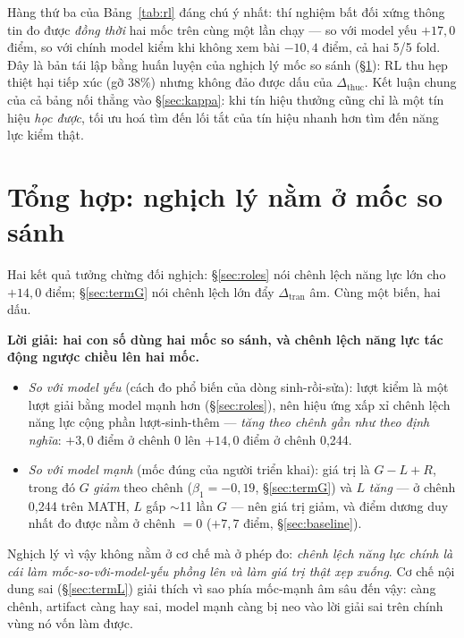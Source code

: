 \documentclass[11pt,a4paper]{article}
\newcommand{\dceil}{\Delta_{\mathrm{tran}}}
\newcommand{\dhonest}{\Delta_{\mathrm{thuc}}}
\begin{document}
Hàng thứ ba của Bảng~\ref{tab:rl} đáng chú ý nhất: thí nghiệm bất đối xứng thông tin đo được
\emph{đồng thời} hai mốc trên cùng một lần chạy --- so với model yếu $+17{,}0$ điểm, so với
chính model kiểm khi không xem bài $-10{,}4$ điểm, cả hai 5/5 fold. Đây là bản tái lập bằng
huấn luyện của nghịch lý mốc so sánh (\S\ref{sec:synthesis}): RL thu hẹp thiệt hại tiếp xúc
(gỡ 38\%) nhưng không đảo được dấu của $\dhonest$. Kết luận chung của cả bảng nối thẳng vào
\S\ref{sec:kappa}: khi tín hiệu thưởng cũng chỉ là một tín hiệu \emph{học được}, tối ưu hoá
tìm đến lối tắt của tín hiệu nhanh hơn tìm đến năng lực kiểm thật.

\section{Tổng hợp: nghịch lý nằm ở mốc so sánh}\label{sec:synthesis}

Hai kết quả tưởng chừng đối nghịch: \S\ref{sec:roles} nói chênh lệch năng lực lớn cho
$+14{,}0$ điểm; \S\ref{sec:termG} nói chênh lệch lớn đẩy $\dceil$ âm. Cùng một biến, hai dấu.

\textbf{Lời giải: hai con số dùng hai mốc so sánh, và chênh lệch năng lực tác động ngược chiều
lên hai mốc.}
\begin{itemize}\itemsep2pt
\item \emph{So với model yếu} (cách đo phổ biến của dòng sinh-rồi-sửa): lượt kiểm là một
      lượt giải bằng model mạnh hơn (\S\ref{sec:roles}), nên hiệu ứng xấp xỉ chênh lệch năng
      lực cộng phần lượt-sinh-thêm --- \emph{tăng theo chênh gần như theo định nghĩa}: $+3{,}0$
      điểm ở chênh 0 lên $+14{,}0$ điểm ở chênh 0,244.
\item \emph{So với model mạnh} (mốc đúng của người triển khai): giá trị là $G - L + R$, trong
      đó $G$ \emph{giảm} theo chênh ($\beta_1 = -0{,}19$, \S\ref{sec:termG}) và $L$ \emph{tăng}
      --- ở chênh 0,244 trên MATH, $L$ gấp $\sim$11 lần $G$ --- nên giá trị giảm, và điểm dương
      duy nhất đo được nằm ở chênh $= 0$ ($+7{,}7$ điểm, \S\ref{sec:baseline}).
\end{itemize}
Nghịch lý vì vậy không nằm ở cơ chế mà ở phép đo: \emph{chênh lệch năng lực chính là cái làm
mốc-so-với-model-yếu phồng lên và làm giá trị thật xẹp xuống}. Cơ chế nội dung sai
(\S\ref{sec:termL}) giải thích vì sao phía mốc-mạnh âm sâu đến vậy: càng chênh, artifact càng
hay sai, model mạnh càng bị neo vào lời giải sai trên chính vùng nó vốn làm được.
\end{document}
